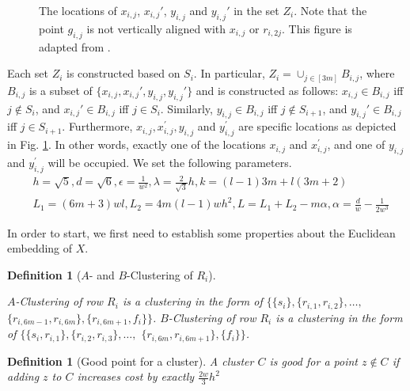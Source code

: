 \documentclass[12pt]{article}
\newtheorem{definition}[theorem]{Definition}
\begin{document}
\begin{figure}
    \centering
    
    \caption{The locations of $x_{i,j}$, $x_{i,j}'$, $y_{i,j}$ and $y_{i,j}'$ in the set $Z_i$. Note that the point $g_{i,j}$ is not vertically aligned with $x_{i, j}$ or $r_{i, 2j}$. This figure is adapted from \cite{vattani2009hardness}.}
    \label{fig:ZFig}
\end{figure}

Each set $Z_i$ is constructed based on $S_i$. In particular, $Z_i = \cup_{j\in [3m]} B_{i,j}$, where $B_{i,j}$ is a subset of $\{x_{i,j},x_{i,j}',y_{i,j},y_{i,j}'\}$ and is constructed as follows: $x_{i,j} \in B_{i,j}$ iff $j \not\in S_i$, and $x_{i,j}' \in B_{i,j}$ iff $j \in S_i$. Similarly,  $y_{i,j} \in B_{i,j}$ iff $j \not\in S_{i+1}$, and $y_{i,j}' \in B_{i,j}$ iff $j \in S_{i+1}$. Furthermore, $x_{i, j}, x_{i,j}^\prime, y_{i,j}$ and $y_{i, j}^\prime$ are specific locations as depicted in Fig. \ref{fig:ZFig}. In other words, exactly one of the locations $x_{i,j}$ and $x_{i,j}^\prime$, and one of $y_{i,j}$ and $y_{i,j}^\prime$ will be occupied. We set the following parameters. 
\vspace{-0.1in}
\begin{align*}
&h = \sqrt{5}, d = \sqrt{6}, \epsilon = \frac{1}{w^2}, \lambda = \frac{2}{\sqrt{3}}h, k = (l-1)3m + l(3m+2)\\
& L_1 = (6m+3)wl, L_2 = 4m(l-1)wh^2, L = L_1 + L_2 - m\alpha, \alpha = \frac{d}{w}-\frac{1}{2w^3}
\end{align*}

In order to start, we first need to establish some properties about the Euclidean embedding of $X$.


\begin{definition}[$A$- and $B$-Clustering of $R_i$]
\label{defn:abclusteringVattani}

$A$-Clustering of row $R_i$ is a clustering in the form of $\{\{s_i\}, \{r_{i,1}, r_{i,2}\}, \ldots,$ $ \{r_{i,6m-1}, r_{i,6m}\},\{r_{i, 6m+1}, f_i\}\}$. $B$-Clustering of row $R_i$ is a clustering in the form of $\{\{s_i, r_{i, 1}\}, \{r_{i,2}, r_{i,3}\}, \ldots,$ $ \{r_{i,6m}, r_{i,6m+1}\},\{f_i\}\}$. 
\end{definition}

\begin{definition}[Good point for a cluster]
\label{defn:goodPointVattani}
A cluster $C$ is good for a point $z \not\in C$ if adding $z$ to $C$ increases cost by exactly $\frac{2w}{3}h^2$ 
\end{definition}
\end{document}
